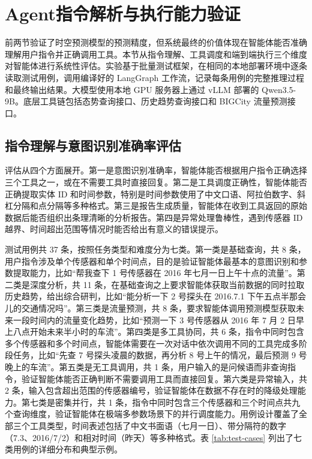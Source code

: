\section{Agent指令解析与执行能力验证}

前两节验证了时空预测模型的预测精度，但系统最终的价值体现在智能体能否准确理解用户指令并正确调用工具。本节从指令理解、工具调度和端到端执行三个维度对智能体进行系统性评估。实验基于批量测试框架，在相同的本地部署环境中逐条读取测试用例，调用编译好的 LangGraph 工作流，记录每条用例的完整推理过程和最终输出结果。大模型使用本地 GPU 服务器上通过 vLLM 部署的 Qwen3.5-9B。底层工具链包括态势查询接口、历史趋势查询接口和 BIGCity 流量预测接口。

\subsection{指令理解与意图识别准确率评估}

评估从四个方面展开。第一是意图识别准确率，智能体能否根据用户指令正确选择三个工具之一，或在不需要工具时直接回复。第二是工具调度正确性，智能体能否正确提取实体 ID 和时间参数，特别是时间参数使用了中文口语、阿拉伯数字、斜杠分隔和点分隔等多种格式。第三是报告生成质量，智能体在收到工具返回的原始数据后能否组织出条理清晰的分析报告。第四是异常处理鲁棒性，遇到传感器 ID 越界、时间超出范围等情况时能否给出有意义的错误提示。

测试用例共 37 条，按照任务类型和难度分为七类。第一类是基础查询，共 8 条，用户指令涉及单个传感器和单个时间点，目的是验证智能体最基本的意图识别和参数提取能力，比如“帮我查下 1 号传感器在 2016 年七月一日上午十点的流量”。第二类是深度分析，共 11 条，在基础查询之上要求智能体获取当前数据的同时拉取历史趋势，给出综合研判，比如“能分析一下 2 号探头在 2016.7.1 下午五点半那会儿的交通情况吗”。第三类是流量预测，共 8 条，要求智能体调用预测模型获取未来一段时间内的流量变化趋势，比如“预测一下 3 号传感器从 2016 年 7 月 2 日早上八点开始未来半小时的车流”。第四类是多工具协同，共 6 条，指令中同时包含多个传感器和多个时间点，智能体需要在一次对话中依次调用不同的工具完成多阶段任务，比如“先查 7 号探头凌晨的数据，再分析 8 号上午的情况，最后预测 9 号晚上的车流”。第五类是无工具调用，共 1 条，用户输入的是问候语而非查询指令，验证智能体能否正确判断不需要调用工具而直接回复。第六类是异常输入，共 2 条，输入包含超出范围的传感器编号，验证智能体在数据不存在时的降级处理能力。第七类是密集并行，共 1 条，指令中同时包含三个传感器和三个时间点共九个查询维度，验证智能体在极端多参数场景下的并行调度能力。用例设计覆盖了全部三个工具类型，时间表述包括了中文书面语（七月一日）、带分隔符的数字（7.3、2016/7/2）和相对时间（昨天）等多种格式。表 \ref{tab:test-cases} 列出了七类用例的详细分布和典型示例。

